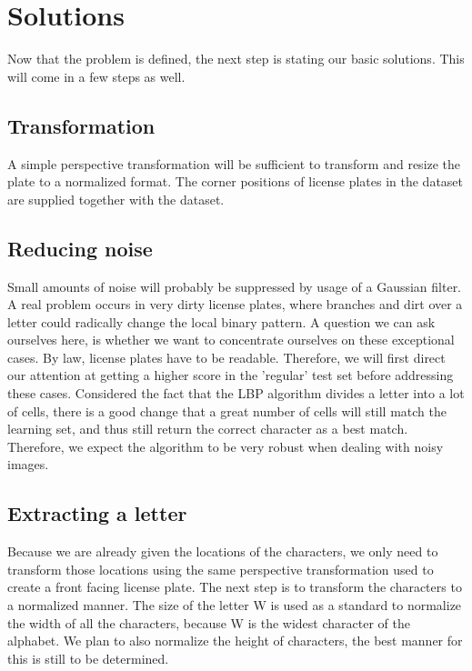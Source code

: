 \documentclass[a4paper]{article}
\begin{document}
\section{Solutions}

Now that the problem is defined, the next step is stating our basic solutions. This will
come in a few steps as well.

\subsection{Transformation}

A simple perspective transformation will be sufficient to transform and resize
the plate to a normalized format. The corner positions of license plates in the
dataset are supplied together with the dataset.

\subsection{Reducing noise}

Small amounts of noise will probably be suppressed by usage of a Gaussian
filter. A real problem occurs in very dirty license plates, where branches and
dirt over a letter could radically change the local binary pattern. A question
we can ask ourselves here, is whether we want to concentrate ourselves on these
exceptional cases. By law, license plates have to be readable. Therefore, we
will first direct our attention at getting a higher score in the 'regular' test
set before addressing these cases. Considered the fact that the LBP algorithm
divides a letter into a lot of cells, there is a good change that a great
number of cells will still match the learning set, and thus still return the
correct character as a best match. Therefore, we expect the algorithm to be
very robust when dealing with noisy images.

\subsection{Extracting a letter}

Because we are already given the locations of the characters, we only need to
transform those locations using the same perspective transformation used to
create a front facing license plate. The next step is to transform the
characters to a normalized manner. The size of the letter W is used as a
standard to normalize the width of all the characters, because W is the widest
character of the alphabet. We plan to also normalize the height of characters,
the best manner for this is still to be determined.
\end{document}

